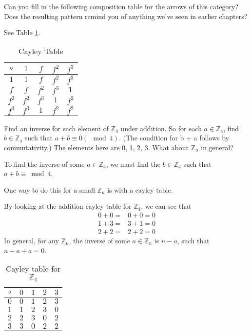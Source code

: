 \begin{ttta}
Can you fill in the following composition table for the arrows of this category?
Does the resulting pattern remind you of anything we’ve seen in earlier
chapters?

See Table \ref{tbl:cayley}.
\begin{table}
\centering
\begin{tabular}{c|cccc}
 $\circ$ & $1$ & $f$ & $f^2$ & $f^3$ \\
 \hline
 $1$ & $1$ & $f$ & $f^2$ & $f^3$ \\
 $f$ & $f$ & $f^2$ & $f^3$ & $1$ \\
 $f^2$ & $f^2$ & $f^3$ & $1$ & $f^2$ \\
 $f^3$ & $f^3$ & $1$ & $f^2$ & $f^2$ \\
\end{tabular}
\caption{Cayley Table}
\label{tbl:cayley}
\end{table}
\end{ttta}
\begin{ttta}
Find an inverse for each element of $\mathbb{Z}_4$ under addition. So for each $a \in
\mathbb{Z}_4$, find $b \in \mathbb{Z}_4$ such that $a + b \equiv 0 (\mod 4)$.
(The condition for b + a follows by commutativity.) The elements here are 0, 1,
2, 3. What about $\mathbb{Z}_n$ in general?
\end{ttta}
\begin{proofitem}
\item To find the inverse of some $a\in\mathbb{Z}_4$, we must find the
    $b\in\mathbb{Z}_4$ such that $a+b\equiv\bmod 4$.
\item One way to do this for a small $\mathbb{Z}_n$ is with a cayley table.
\item By looking at the addition cayley table for $\mathbb{Z}_4$, we can see that
    \setcounter{equation}{0}
    \begin{align}
        0+0=&0+0=0\\
        1+3=&3+1=0\\
        2+2=&2+2=0
    \end{align}
    In general, for any $\mathbb{Z}_n$, the inverse of some $a\in\mathbb{Z}_n$
    is $n-a$, such that $n-a+a=0$.
\begin{table}
\centering
\begin{tabular}{c|cccc}
 $\circ$ & $0$ & $1$ & $2$ & $3$ \\
 \hline
 $0$ & $0$ & $1$ & $2$ & $3$ \\
 $1$ & $1$ & $2$ & $3$ & $0$ \\
 $2$ & $2$ & $3$ & $0$ & $2$ \\
 $3$ & $3$ & $0$ & $2$ & $2$ \\
\end{tabular}
\caption{Cayley table for $\mathbb{Z}_4$}
\end{table}
\end{proofitem}

